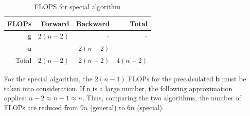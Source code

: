 \documentclass[%
oneside,                 %
final,                   %
10pt]{article}
\begin{document}
\begin{table}[H]
\caption{FLOPS for special algorithm}
\centering
	\begin{tabular}{r r r r}
		\toprule
		FLOPs   & Forward & Backward & Total \\ [0.5ex]
		\midrule
		$\mathbf{g}$ & $2 (n-2)$       & -        & -    \\
        	$\mathbf{u}$ & -       & $2 (n-2)$        & -     \\
        	Total        & $2 (n-2)$       & $2 (n-2)$  & $4 (n-2)$      \\ [1ex]
		\bottomrule
	\end{tabular}
	\label{tbl: S_FLOPS}
\end{table}	

For the special algorithm, the $2(n-1)$ FLOPs for the precalculated $\mathbf{b}$ must be taken into consideration. If n is a large number, the following approximation applies: $n-2 \approx n-1 \approx n$. Thus, comparing the two algorithms, the number of FLOPs are reduced from $9n$ (general) to $6n$ (special).
\end{document}
